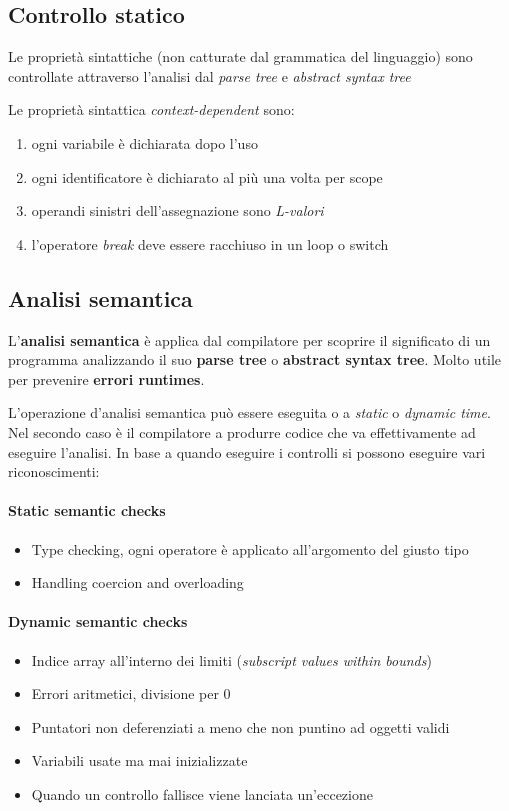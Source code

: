 \subsection{Controllo statico}
Le proprietà sintattiche (non catturate dal grammatica del linguaggio) sono
controllate attraverso l'analisi dal \textit{parse tree} e
\textit{abstract syntax tree}

Le proprietà sintattica \textit{context-dependent} sono:
\begin{enumerate}
\item ogni variabile è dichiarata dopo l'uso
\item ogni identificatore è dichiarato al più una volta per scope
\item operandi sinistri dell'assegnazione sono \textit{L-valori}
\item l'operatore \textit{break} deve essere racchiuso in un loop o switch
\end{enumerate}

\subsection{Analisi semantica}
\begin{definition}
L'\textbf{analisi semantica} è applica dal compilatore per scoprire il
significato di un programma analizzando il suo \textbf{parse tree} o
\textbf{abstract syntax tree}. Molto utile per prevenire
\textbf{errori runtimes}.
\end{definition}

L'operazione d'analisi semantica può essere eseguita o a \textit{static} o
\textit{dynamic time}. Nel secondo caso è il compilatore a produrre codice che
va effettivamente ad eseguire l'analisi. In base a quando eseguire i controlli
si possono eseguire vari riconoscimenti:
\paragraph{Static semantic checks}
\begin{itemize}
\item Type checking, ogni operatore è applicato all'argomento del
giusto tipo
\item Handling coercion and overloading
\end{itemize}

\paragraph{Dynamic semantic checks}
\begin{itemize}
\item Indice array all'interno dei limiti
(\textit{subscript values within bounds})
\item Errori aritmetici, divisione per 0
\item Puntatori non deferenziati a meno che non puntino ad oggetti validi
\item Variabili usate ma mai inizializzate
\item Quando un controllo fallisce viene lanciata un'eccezione
\end{itemize}

